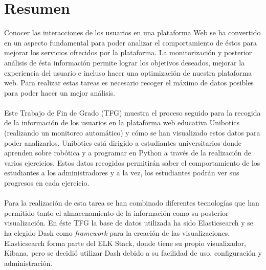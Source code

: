 \newpage
\thispagestyle{plain}			%
\setlength{\parskip}{0pt plus 1.0pt}
\section*{Resumen}
Conocer las interacciones de los usuarios en una plataforma Web se ha convertido en un aspecto fundamental para poder analizar el comportamiento de éstos para mejorar los servicios ofrecidos por la plataforma. La monitorización y posterior análisis de ésta información permite lograr los objetivos deseados, mejorar la experiencia del usuario e incluso hacer una optimización de nuestra plataforma web. Para realizar estas tareas es necesario recoger el máximo de datos posibles para poder hacer un mejor análisis.
\\
 \\
Este Trabajo de Fin de Grado (TFG) muestra el proceso seguido para la recogida de la información de los usuarios en la plataforma web educativa Unibotics (realizando un monitoreo automático) y cómo se han visualizado estos datos para poder analizarlos. Unibotics está dirigido a estudiantes universitarios donde aprenden sobre robótica y a programar en Python a través de la realización de varios ejercicios. Estos datos recogidos permitirán saber el comportamiento de los estudiantes a los administradores y a la vez, los estudiantes podrán ver sus progresos en cada ejercicio.
\\
\\
Para la realización de esta tarea se han combinado diferentes tecnologías que han permitido tanto el almacenamiento de la información como su posterior visualización. En éste TFG la base de datos utilizada ha sido Elasticsearch y se ha elegido Dash como \textit{framework} para la creación de las visualizaciones. Elasticsearch forma parte del ELK Stack, donde tiene su propio visualizador, Kibana, pero se decidió utilizar Dash debido a su facilidad de uso, configuración y administración.

